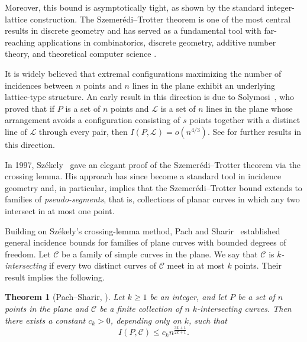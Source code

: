 \documentclass[11pt]{article}
\theoremstyle{plain}
\newtheorem{theorem}{Theorem}[section]
\theoremstyle{definition}
\theoremstyle{remark}
\begin{document}
\noindent
Moreover, this bound is asymptotically tight, as shown by the
standard integer-lattice construction.  The Szemer\'edi--Trotter theorem is one of the most central results in discrete geometry and has served as a fundamental tool with far-reaching applications in combinatorics, discrete geometry, additive number theory, and theoretical computer science \cite{ST, PachSharir, MatousekBook, SharirAgarwal95, Elekes97, GuthKatz}.  

It is widely believed that extremal configurations maximizing the number of incidences between $n$ points and $n$ lines in the plane exhibit an underlying lattice-type structure. 
An early result in this direction is due to Solymosi~\cite{SolymosiLocallyDense}, who proved that if $P$ is a set of $n$ points and $\mathcal{L}$ is a set of $n$ lines in the plane whose arrangement avoids a configuration consisting of $s$ points together with a distinct line of $\mathcal{L}$ through every pair, then $I(P,\mathcal{L}) = o(n^{4/3}).$  See \cite{sukm,SuT,BF} for further results in this direction.
 

In 1997, Sz\'ekely~\cite{Sz} gave an elegant proof of the Szemer\'edi--Trotter theorem via the crossing lemma. 
His approach has since become a standard tool in incidence geometry and, in particular, implies that the Szemer\'edi--Trotter bound extends to families of \emph{pseudo-segments}, that is, collections of planar curves in which any two intersect in at most one point.


Building on Sz\'ekely's crossing-lemma method, Pach and Sharir~\cite{PachSharir}
established general incidence bounds for families of plane curves with
bounded degrees of freedom.  Let \(\mathcal C\) be a family of simple curves in the plane. We say that \(\mathcal C\) is \emph{\(k\)-intersecting} if every two distinct curves of \(\mathcal C\) meet in at most \(k\) points.  Their result implies the following.




















\begin{theorem}[Pach--Sharir, \cite{PachSharir}]\label{PS}
Let $k \ge 1$ be an integer, and let $P$ be a set of $n$ points in the plane and $\mathcal C$ be a finite collection of $n$ $k$-intersecting curves. Then there exists a constant $c_k>0$, depending only on $k$, such that
\[
I(P,\mathcal C)\le c_k n^{\frac{3k+1}{2k+1}}.
\]
\end{theorem}
\end{document}

